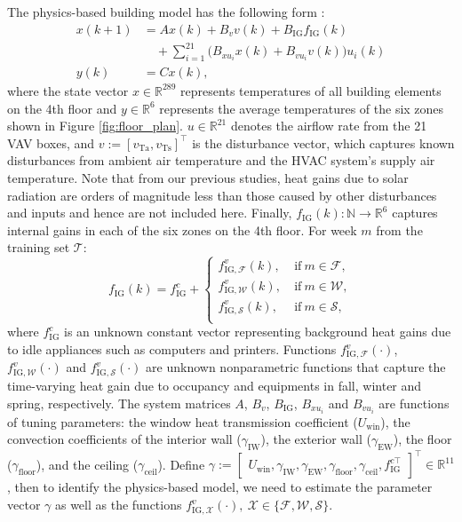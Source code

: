 The physics-based building model has the following form \cite{Qie}:
\begin{subequations}\label{eq:physics_model}
\begin{align}
x(k+1) &= Ax(k)+B_v v(k) + B_\text{IG} f_\text{IG}(k) \label{eq:physics_model1} \\ \nonumber
	& \quad + \textstyle \sum_{i=1}^{21} \big( B_{xu_i} x(k) + B_{vu_i} v(k) \big) u_i(k) \label{eq:physics_model_2} \\
y(k) &= C x(k),
\end{align}
\end{subequations}
where the state vector $x \in \mathbb{R}^{289}$ represents temperatures of all building elements on the 4th floor and $y \in \mathbb{R}^6$ represents the average temperatures of the six zones shown in Figure \ref{fig:floor_plan}. $u \in \mathbb{R}^{21}$ denotes the airflow rate from the 21 VAV boxes, and $v := [v_\text{Ta}, v_\text{Ts}]^\top$ is the disturbance vector, which captures known disturbances from ambient air temperature and the HVAC system's supply air temperature. 
Note that from our previous studies, heat gains due to solar radiation are orders of magnitude less than those caused by other disturbances and inputs and hence are not included here. 
Finally, $f_\text{IG}(k) : \mathbb{N} \rightarrow \mathbb{R}^6$ captures internal gains in each of the six zones on the 4th floor. For week $m$ from the training set $\mathcal{T}$:
\begin{equation}\label{eq:fig}
f_\text{IG}(k) = f_\text{IG}^c + \begin{cases}
	f_{\text{IG},\mathcal{F}}^v(k), & ~\text{if} ~ m \in \mathcal{F}, \\
	f_{\text{IG},\mathcal{W}}^v(k), & ~\text{if} ~ m \in \mathcal{W}, \\
	f_{\text{IG},\mathcal{S}}^v(k), & ~\text{if} ~ m \in \mathcal{S}, \\
	\end{cases}
\end{equation}
where $f_\text{IG}^c$ is an unknown constant vector representing background heat gains due to idle appliances such as computers and printers. Functions $f_{\text{IG},\mathcal{F}}^v(\cdot)$, $f_{\text{IG},\mathcal{W}}^v(\cdot)$ and $f_{\text{IG},\mathcal{S}}^v(\cdot)$ are unknown nonparametric functions that capture the time-varying heat gain due to occupancy and equipments in fall, winter and spring, respectively.
The system matrices $A$, $B_v$, $B_\text{IG}$, $B_{xu_i}$ and $B_{vu_i}$ are functions of tuning parameters: the window heat transmission coefficient ($U_\text{win}$), the convection coefficients of the interior wall ($\gamma_\text{IW}$), the exterior wall ($\gamma_\text{EW}$), the floor ($\gamma_\text{floor}$), and the ceiling ($\gamma_\text{ceil}$). 
Define $\gamma := \begin{bmatrix} U_\text{win}, \gamma_\text{IW}, \gamma_\text{EW}, \gamma_\text{floor}, \gamma_\text{ceil}, f_\text{IG}^{c\top} \end{bmatrix}^\top \in \mathbb{R}^{11}$, then to identify the physics-based model, we need to estimate the parameter vector $\gamma$ as well as the functions $f_{\text{IG},\mathcal{X}}^v(\cdot),~\mathcal{X} \in \{\mathcal{F}, \mathcal{W}, \mathcal{S}\}$.

